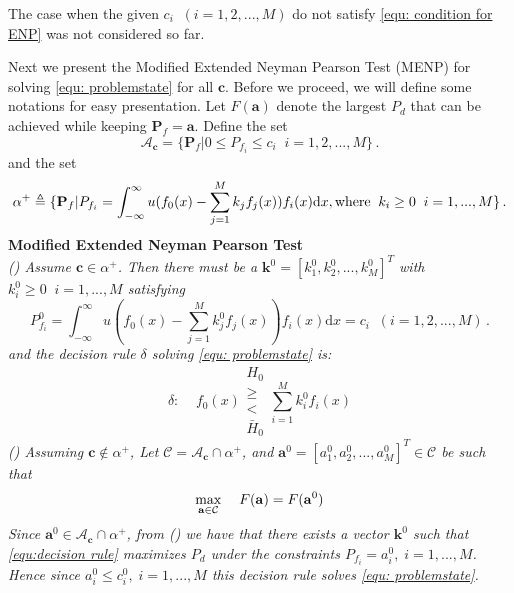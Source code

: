 The case when the given $c_i\;\; (i= 1, 2, ..., M)$ do not satisfy \eqref{equ: condition for ENP} was not considered so far. 


Next we present the Modified Extended Neyman Pearson Test (MENP) for solving \eqref{equ: problemstate} for all $\mathbf{c}$.
Before we proceed, we will define some notations for easy presentation.
Let $F(\mathbf{a})$ denote the largest $P_d$ that can be achieved while keeping $\mathbf{P}_f = \mathbf{a}$. 
Define the set 
\[\mathcal{A}_\mathbf{c} = \{
  \mathbf{P}_f | 0 \leq P_{f_i} \leq c_i
  \;\;i=1, 2, ..., M\}\,.
\]
and the set 
\[
\alpha^+ \triangleq \{\mathbf{P}_f | P_{f_i} = \int_{-\infty}^{\infty} u(f_0(x) - \sum_{j=1}^{M}k_j f_j(x)) f_i(x) \mathrm{d}x, \text{where\;\;} k_i \geq 0 \;\;i=1, ..., M\}\,.
\]
\noindent \textbf{Modified Extended Neyman Pearson Test}
\noindent \textit{
\\\textnormal{()} Assume $\mathbf{c} \in \alpha^+$. Then there must be a $\mathbf{k}^0 = [k_1^0, k_2^0, ..., k_M^0]^T$ with $k_i^0 \geq 0\;\;i=1, ..., M$ satisfying
}
\begin{equation}
\label{equ:Pf}
  P_{f_i}^0 = \int_{-\infty}^{\infty} u(f_0(x) - \sum_{j=1}^{M}k_j^0f_j(x))f_i(x)\mathrm{d}x = c_i \;\; (i= 1, 2, ..., M)\,.
\end{equation}
\textit{
    and the decision rule $\delta $ solving  \eqref{equ: problemstate} is:
}
\begin{equation}
\label{equ:decision rule}
\delta:\;\;\;\;f_0(x) \substack{H_0 \\ \geq \\ < \\ \bar{H}_0} \sum_{i=1}^{M}k_i^0f_i(x)
\end{equation}
\textit{
\noindent \textnormal{()} Assuming $\mathbf{c} \notin \alpha^+$, Let $\mathcal{C} = \mathcal{A}_{\mathbf{c}} \cap \alpha^+$, and $\mathbf{a}^0 = [a_1^0, a_2^0, ..., a_M^0]^T \in \mathcal{C}$ be such that
}
\begin{equation}
\label{equ: F0}
\max_{\mathbf{a} \in \mathcal{C}}\;\;\;\;F(\mathbf{a}) = F(\mathbf{a}^0)\\
\end{equation}
\textit{
Since $\mathbf{a}^0 \in \mathcal{A}_{\mathbf{c}} \cap \alpha^+$, from \textnormal{()} we have that there exists a vector $\mathbf{k}^0$ such that \eqref{equ:decision rule}  maximizes $P_d$ under the constraints $P_{f_i} = a_i^0, \;i=1, ..., M$. Hence since $a_i^0 \leq c_i^0, \;i=1, ..., M$ this decision rule  solves \eqref{equ: problemstate}.
}


